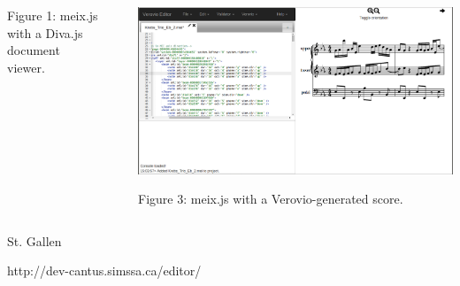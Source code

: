 \documentclass[final]{beamer}
\begin{document}
\begin{frame}[fragile,t]
\begin{minipage}[t][.8\textheight]{\textwidth}
\begin{columns}
\begin{column}{0.95\textwidth}
\begin{block}{}
\begin{columns}
\begin{column}{0.47\textwidth}
\begin{block}{}
                \small{Figure 1: meix.js with a Diva.js document viewer.}
            \end{block}
        \end{column}

        \begin{column}{0.00cm}
        \end{column}

        \begin{column}{0.47\textwidth}
            \begin{block}{}
                \centering
                \includegraphics[scale=0.75]{mei_editor_verovio}

                \small{Figure 3: meix.js with a Verovio-generated score.}
            \end{block}
        \end{column}
        \end{columns}
        \end{block}

        \vspace{2cm}
        \begin{block}{}
        \vspace{-3cm}
        \begin{columns}
        \begin{column}{0.47\textwidth}
            \vspace{-0.2cm}
            \begin{block}{St. Gallen}
            \begin{center}
                \vspace{-0.75\baselineskip}
                \small{http://dev-cantus.simssa.ca/editor/}
                \normalsize
                \vspace{0.25\baselineskip}
            \end{center}
    

\end{block}
\end{column}
\end{columns}
\end{block}
\end{column}
\end{columns}
\end{minipage}
\end{frame}
\end{document}
